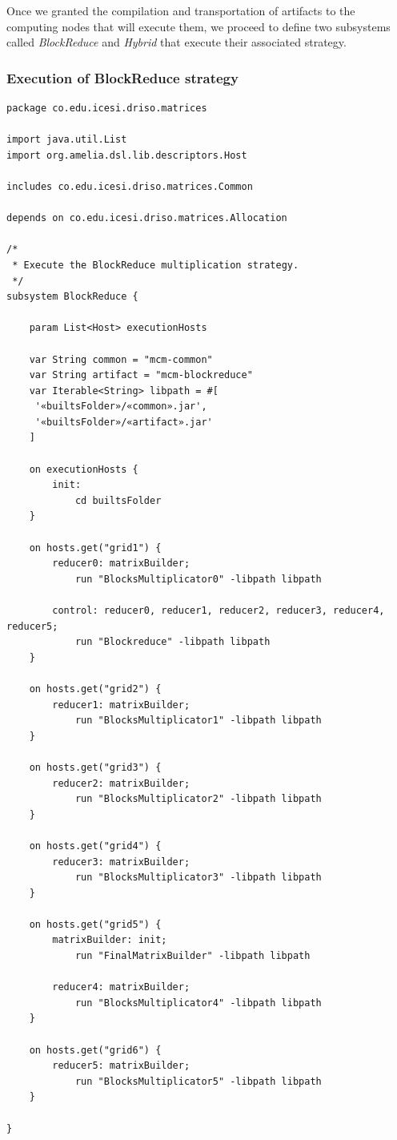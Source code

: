 \documentclass{article}
\begin{document}
Once we granted the compilation and transportation of artifacts to the computing nodes that will execute them, we proceed to define two subsystems called \textit{BlockReduce} and \textit{Hybrid} that execute their associated strategy. \\

\subsubsection{Execution of BlockReduce strategy}

\begin{lstlisting}[style=amelia,caption=Subsystem for executing BlockReduce strategy.]
package co.edu.icesi.driso.matrices

import java.util.List
import org.amelia.dsl.lib.descriptors.Host

includes co.edu.icesi.driso.matrices.Common

depends on co.edu.icesi.driso.matrices.Allocation

/*
 * Execute the BlockReduce multiplication strategy.
 */
subsystem BlockReduce {
	
	param List<Host> executionHosts
	
	var String common = "mcm-common"
	var String artifact = "mcm-blockreduce"
	var Iterable<String> libpath = #[
	 '«builtsFolder»/«common».jar',
	 '«builtsFolder»/«artifact».jar'
	]
	
	on executionHosts {
		init:
            cd builtsFolder
	}
	
	on hosts.get("grid1") {
		reducer0: matrixBuilder;
			run "BlocksMultiplicator0" -libpath libpath

		control: reducer0, reducer1, reducer2, reducer3, reducer4, reducer5;
			run "Blockreduce" -libpath libpath
	}
	
	on hosts.get("grid2") {
		reducer1: matrixBuilder;
			run "BlocksMultiplicator1" -libpath libpath
	}
	
	on hosts.get("grid3") {
		reducer2: matrixBuilder;
			run "BlocksMultiplicator2" -libpath libpath
	}
	
	on hosts.get("grid4") {
		reducer3: matrixBuilder;
			run "BlocksMultiplicator3" -libpath libpath
	}
	
	on hosts.get("grid5") {
		matrixBuilder: init;
			run "FinalMatrixBuilder" -libpath libpath
	
		reducer4: matrixBuilder;
			run "BlocksMultiplicator4" -libpath libpath
	}
	
	on hosts.get("grid6") {	
		reducer5: matrixBuilder;
			run "BlocksMultiplicator5" -libpath libpath
	}

}
\end{lstlisting}
\end{document}
